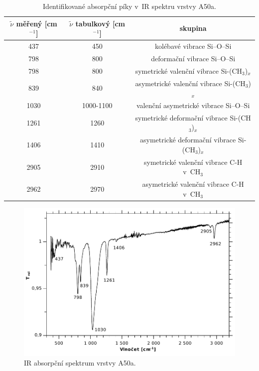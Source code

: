 \documentclass[12pt]{article}
\begin{document}
\begin{table}[htbp]
\begin{center}
\begin{tabular}{|c|c|c|}
\hline
$\tilde{\nu}$ měřený [cm$^{-1}$] & $\tilde{\nu}$ tabulkový [cm$^{-1}$] & skupina \\ \hline
437 & 450 & kolébavé vibrace Si--O--Si \\ \hline
798 & 800 & deformační vibrace Si--O--Si \\ \hline
798 & 800 & symetrické valenční vibrace Si-(CH$_3$)$_x$ \\ \hline
839 & 840 & asymetrické valenční vibrace Si-(CH$_3$)$_x$ \\ \hline
1030 & 1000-1100 & valenční asymetrické vibrace Si--O--Si \\ \hline
1261 & 1260 & symetrické deformační vibrace Si-(CH$_3$)$_x$ \\ \hline
1406 & 1410 & asymetrické deformační vibrace Si-(CH$_3$)$_x$ \\ \hline
2905 & 2910 & symetrické valenční vibrace C-H v~CH$_3$ \\ \hline
2962 & 2970 & asymetrické valenční vibrace C-H v~CH$_3$ \\ \hline
\end{tabular}
\caption{Identifikované absorpční píky v~IR spektru vrstvy A50a.}
\label{AIR}
\end{center}
\end{table}

\begin{figure}
  \centering
  \includegraphics[width=135mm]{img/A50a-T.pdf}
  \caption{IR absorpční spektrum vrstvy A50a.}
  \label{A50aIR}
\end{figure}
\end{document}
